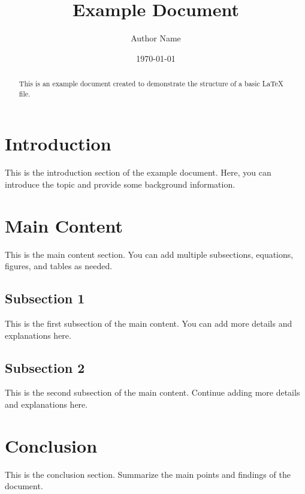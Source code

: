 \documentclass{article}
\title{Example Document}
\author{Author Name}
\date{\today}
\begin{document}
\maketitle

\begin{abstract}
This is an example document created to demonstrate the structure of a basic LaTeX file.
\end{abstract}

\section{Introduction}
This is the introduction section of the example document. Here, you can introduce the topic and provide some background information.

\section{Main Content}
This is the main content section. You can add multiple subsections, equations, figures, and tables as needed.

\subsection{Subsection 1}
This is the first subsection of the main content. You can add more details and explanations here.

\subsection{Subsection 2}
This is the second subsection of the main content. Continue adding more details and explanations here.

\section{Conclusion}
This is the conclusion section. Summarize the main points and findings of the document.
\end{document}
